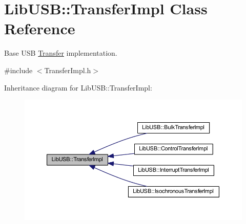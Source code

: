 \hypertarget{class_lib_u_s_b_1_1_transfer_impl}{\section{Lib\-U\-S\-B\-:\-:Transfer\-Impl Class Reference}
\label{class_lib_u_s_b_1_1_transfer_impl}
}


Base U\-S\-B \hyperlink{class_lib_u_s_b_1_1_transfer}{Transfer} implementation.  




{\ttfamily \#include $<$Transfer\-Impl.\-h$>$}



Inheritance diagram for Lib\-U\-S\-B\-:\-:Transfer\-Impl\-:
\nopagebreak
\begin{figure}[H]
\begin{center}
\leavevmode
\includegraphics[width=350pt]{class_lib_u_s_b_1_1_transfer_impl__inherit__graph}
\end{center}
\end{figure}

